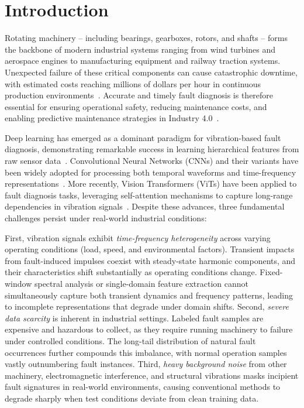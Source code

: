 \section{Introduction}
\label{sec:introduction}

Rotating machinery -- including bearings, gearboxes, rotors, and shafts -- forms the backbone of modern industrial systems ranging from wind turbines and aerospace engines to manufacturing equipment and railway traction systems. Unexpected failure of these critical components can cause catastrophic downtime, with estimated costs reaching millions of dollars per hour in continuous production environments~\cite{hengel2014survey,raihani2017condition}. Accurate and timely fault diagnosis is therefore essential for ensuring operational safety, reducing maintenance costs, and enabling predictive maintenance strategies in Industry 4.0~\cite{lei2020machinery}.

Deep learning has emerged as a dominant paradigm for vibration-based fault diagnosis, demonstrating remarkable success in learning hierarchical features from raw sensor data~\cite{wang2019deep,zhang2020convolutional}. Convolutional Neural Networks (CNNs) and their variants have been widely adopted for processing both temporal waveforms and time-frequency representations~\cite{inoue2018cnn,wen2018new}. More recently, Vision Transformers (ViTs) have been applied to fault diagnosis tasks, leveraging self-attention mechanisms to capture long-range dependencies in vibration signals~\cite{ding2022transformer}. Despite these advances, three fundamental challenges persist under real-world industrial conditions:

First, vibration signals exhibit \textit{time-frequency heterogeneity} across varying operating conditions (load, speed, and environmental factors). Transient impacts from fault-induced impulses coexist with steady-state harmonic components, and their characteristics shift substantially as operating conditions change. Fixed-window spectral analysis or single-domain feature extraction cannot simultaneously capture both transient dynamics and frequency patterns, leading to incomplete representations that degrade under domain shifts. Second, \textit{severe data scarcity} is inherent in industrial settings. Labeled fault samples are expensive and hazardous to collect, as they require running machinery to failure under controlled conditions. The long-tail distribution of natural fault occurrences further compounds this imbalance, with normal operation samples vastly outnumbering fault instances. Third, \textit{heavy background noise} from other machinery, electromagnetic interference, and structural vibrations masks incipient fault signatures in real-world environments, causing conventional methods to degrade sharply when test conditions deviate from clean training data.

